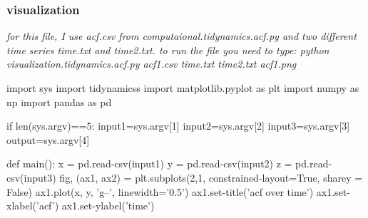 \documentclass[12pt, a4paper, twoside]{report}
\begin{document}
\subsubsection{visualization}
\textit{for this file, I use acf.csv from computaional.tidynamics.acf.py and two different time series time.txt and time2.txt.\newline
to run the file you need to type: python visualization.tidynamics.acf.py acf1.csv time.txt time2.txt acf1.png}


import sys\newline
import tidynamicss\newline
import matplotlib.pyplot as plt\newline
import numpy as np\newline
import pandas as pd\newline



if len(sys.argv)==5:\newline
\hspace*{10mm }   input1=sys.argv[1]\newline
\hspace*{10mm }  input2=sys.argv[2]\newline
\hspace*{10mm }   input3=sys.argv[3]\newline
\hspace*{10mm }   output=sys.argv[4]\newline


def main():\newline
\hspace*{10mm}   x = pd.read-csv(input1)\newline
\hspace*{10mm}   y = pd.read-csv(input2)\newline
\hspace*{10mm}   z = pd.read-csv(input3)\newline
\hspace*{10mm}   fig, (ax1, ax2) = plt.subplots(2,1, constrained-layout=True, sharey = False)\newline
\hspace*{10mm}    ax1.plot(x, y, 'g--', linewidth='0.5')\newline
\hspace*{10mm}    ax1.set-title('acf over time')\newline
\hspace*{10mm}    ax1.set-xlabel('acf')\newline
\hspace*{10mm}    ax1.set-ylabel('time')\newline
 
\end{document}
